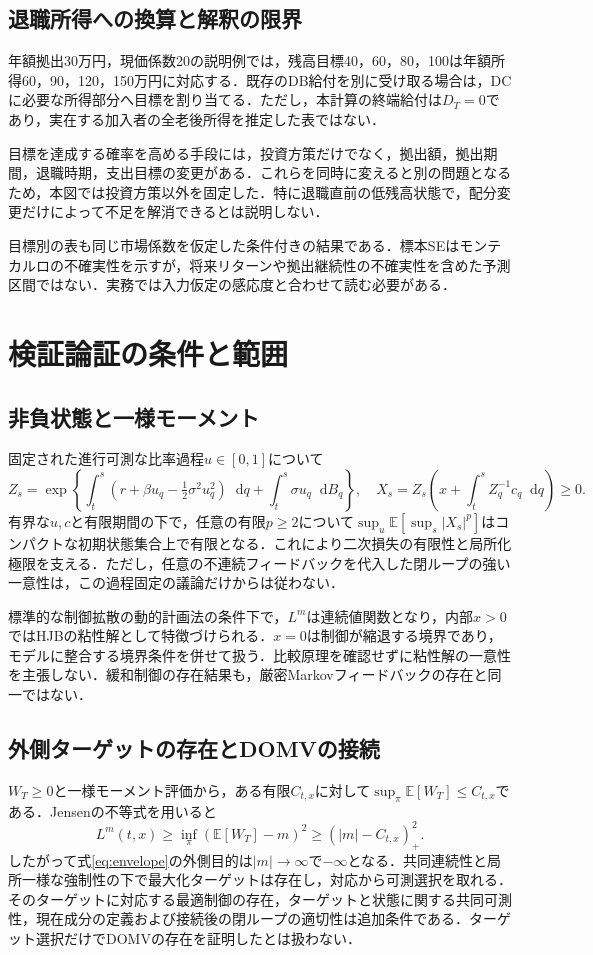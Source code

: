 \documentclass[11pt,a4paper]{article}
\numberwithin{equation}{section}
\numberwithin{table}{section}
\numberwithin{figure}{section}
\theoremstyle{plain}
\theoremstyle{definition}
\newcommand{\E}{\mathbb{E}}
\newcommand{\dd}{\mathop{}\!\mathrm{d}}
\begin{document}
\subsection{退職所得への換算と解釈の限界}
年額拠出30万円，現価係数20の説明例では，残高目標40，60，80，100は年額所得60，90，120，150万円に対応する．既存のDB給付を別に受け取る場合は，DCに必要な所得部分へ目標を割り当てる．ただし，本計算の終端給付は$D_T=0$であり，実在する加入者の全老後所得を推定した表ではない．

目標を達成する確率を高める手段には，投資方策だけでなく，拠出額，拠出期間，退職時期，支出目標の変更がある．これらを同時に変えると別の問題となるため，本図では投資方策以外を固定した．特に退職直前の低残高状態で，配分変更だけによって不足を解消できるとは説明しない．

目標別の表も同じ市場係数を仮定した条件付きの結果である．標本SEはモンテカルロの不確実性を示すが，将来リターンや拠出継続性の不確実性を含めた予測区間ではない．実務では入力仮定の感応度と合わせて読む必要がある．
\FloatBarrier
\section{検証論証の条件と範囲}
\label{app:verify}
\subsection{非負状態と一様モーメント}
固定された進行可測な比率過程$u\in[0,1]$について
\begin{equation}
Z_s=\exp\left\{\int_t^s(r+\beta u_q-\tfrac12\sigma^2u_q^2)\dd q+
\int_t^s\sigma u_q\dd B_q\right\},\quad
X_s=Z_s\left(x+\int_t^sZ_q^{-1}c_q\dd q\right)\geq0.
\end{equation}
有界な$u,c$と有限期間の下で，任意の有限$p\geq2$について$\sup_u\E[\sup_s|X_s|^p]$はコンパクトな初期状態集合上で有限となる．これにより二次損失の有限性と局所化極限を支える．ただし，任意の不連続フィードバックを代入した閉ループの強い一意性は，この過程固定の議論だけからは従わない．

標準的な制御拡散の動的計画法の条件下で，$L^m$は連続値関数となり，内部$x>0$ではHJBの粘性解として特徴づけられる\citep{FlemingSoner2006}．$x=0$は制御が縮退する境界であり，モデルに整合する境界条件を併せて扱う．比較原理を確認せずに粘性解の一意性を主張しない．緩和制御の存在結果も，厳密Markovフィードバックの存在と同一ではない．

\subsection{外側ターゲットの存在とDOMVの接続}
$W_T\geq0$と一様モーメント評価から，ある有限$C_{t,x}$に対して$\sup_\pi\E[W_T]\leq C_{t,x}$である．Jensenの不等式を用いると
\begin{equation}
L^m(t,x)\geq\inf_\pi(\E[W_T]-m)^2\geq(|m|-C_{t,x})_+^2.
\end{equation}
したがって式\eqref{eq:envelope}の外側目的は$|m|\to\infty$で$-\infty$となる．共同連続性と局所一様な強制性の下で最大化ターゲットは存在し，対応から可測選択を取れる．そのターゲットに対応する最適制御の存在，ターゲットと状態に関する共同可測性，現在成分の定義および接続後の閉ループの適切性は追加条件である．ターゲット選択だけでDOMVの存在を証明したとは扱わない．
\end{document}
